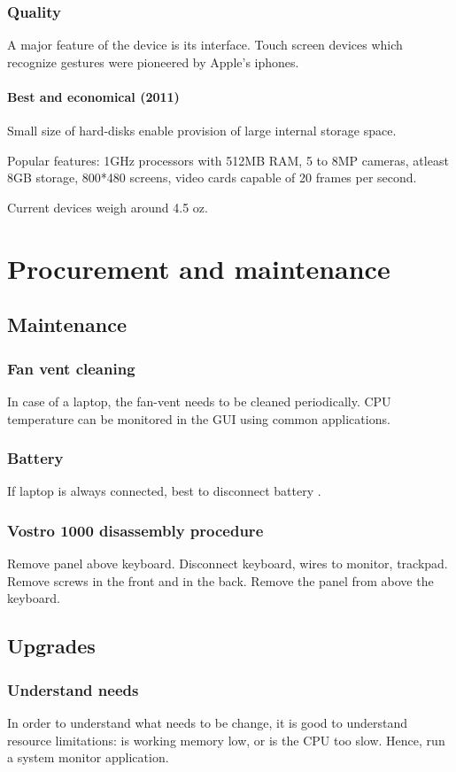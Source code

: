 \documentclass[oneside, article]{memoir}
\begin{document}
\subsection{Quality}
A major feature of the device is its interface. Touch screen devices which recognize gestures were pioneered by Apple's iphones.

\subsubsection{Best and economical (2011)}
Small size of hard-disks enable provision of large internal storage space.

Popular features: 1GHz processors with 512MB RAM, 5 to 8MP cameras, atleast 8GB storage, 800*480 screens, video cards capable of 20 frames per second.

Current devices weigh around 4.5 oz.

\chapter{Procurement and maintenance}
\section{Maintenance}
\subsection{Fan vent cleaning}
In case of a laptop, the fan-vent needs to be cleaned periodically. CPU temperature can be monitored in the GUI using common applications.

\subsection{Battery}
If laptop is always connected, best to disconnect battery \chk.

\subsection{Vostro 1000 disassembly procedure}
Remove panel above keyboard. Disconnect keyboard, wires to monitor, trackpad. Remove screws in the front and in the back. Remove the panel from above the keyboard.

\section{Upgrades}
\subsection{Understand needs}
In order to understand what needs to be change, it is good to understand resource limitations: is working memory low, or is the CPU too slow. Hence, run a system monitor application.
\end{document}
